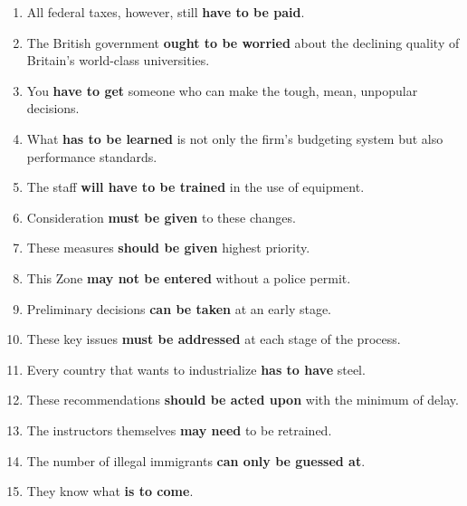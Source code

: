 \documentclass[main.tex]{subfiles}
\begin{document}
\begin{enumerate}[nosep,leftmargin=*]
	\item All federal taxes, however, still \textbf{have to be paid}.
	\item The British government \textbf{ought to be worried} about the declining quality of Britain's world-class universities.
	\item You \textbf{have to get} someone who can make the tough, mean, unpopular decisions.
	\item What \textbf{has to be learned} is not only the firm's budgeting system but also performance standards.
	\item The staff \textbf{will have to be trained} in the use of equipment.
	\item Consideration \textbf{must be given} to these changes.
	\item These measures \textbf{should be given} highest priority.
	\item This Zone \textbf{may not be entered} without a police permit.
	\item Preliminary decisions \textbf{can be taken} at an early stage.
	\item These key issues \textbf{must be addressed} at each stage of the process.
	\item Every country that wants to industrialize \textbf{has to have} steel.
	\item These recommendations \textbf{should be acted upon} with the minimum of delay.
	\item The instructors themselves \textbf{may need} to be retrained.
	\item The number of illegal immigrants \textbf{can only be guessed at}.
	\item They know what \textbf{is to come}.
\end{enumerate}
\

\end{document}
